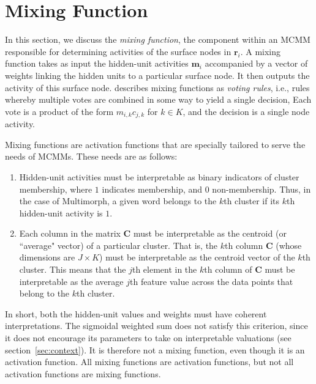 \section{Mixing Function}
\label{sec:mixing-function}

In this section, we discuss the \emph{mixing function}, 
the component within an MCMM responsible for determining 
activities of the surface nodes in $\textbf{r}_i$.
A mixing function takes as input the hidden-unit activities $\textbf{m}_i$ accompanied by a vector of weights  
linking the hidden units to a particular surface node. It then outputs the activity 
of this surface node. 
\citet{saund:94} describes mixing functions as
\emph{voting rules}, i.e., rules whereby multiple votes are combined in some way to yield a single decision, 
Each vote is a product of the form $m_{i,k}c_{j,k}$ for $k \in K$, and the decision is a single node activity. 

Mixing functions are 
activation functions that are specially tailored to serve the needs of MCMMs. 
These needs are as follows:
\begin{enumerate}
\item Hidden-unit activities 
must be interpretable as binary indicators of cluster membership, where $1$ 
indicates membership, and $0$ non-membership. Thus, in the case of 
Multimorph, a given word belongs to the 
$k$th cluster if its $k$th hidden-unit activity is $1$.
\item Each column in the matrix $\textbf{C}$ must be interpretable as the centroid 
(or ``average" vector) of a particular cluster. That is, the $k$th column 
$\textbf{C}$ (whose dimensions are $J \times K$) must be interpretable as the centroid vector of the $k$th cluster. This means that the $j$th element in the $k$th column of $\textbf{C}$ must be interpretable as the average $j$th feature value across the data points that belong to the $k$th cluster. 

\end{enumerate}
In short, both the hidden-unit values and weights must have coherent interpretations. 
The sigmoidal weighted sum
does not satisfy this criterion, since it does not encourage its 
parameters to take on interpretable valuations (see section~\ref{sec:context}). It is therefore 
not a mixing function, even though it is an activation function.  All mixing functions
are activation functions, but not all activation functions are mixing functions.

